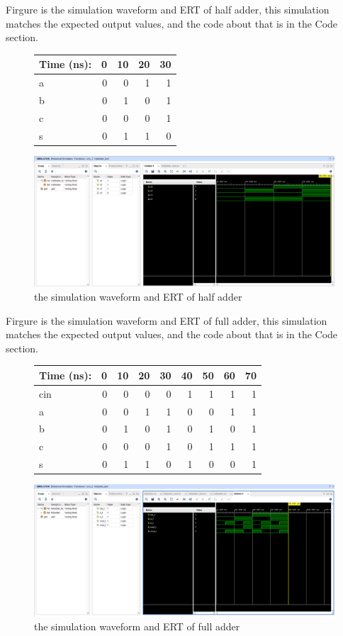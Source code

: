 \documentclass[11pt]{article}
\begin{document}
Firgure is the simulation waveform and ERT of half adder, this simulation matches the expected output values, and the code about that is in the Code section. \\
\begin{figure}[ht]\centering
	\begin{tabular}{l|rrrr}
		Time (ns): & 0 & 10 & 20 & 30 \\
		\midrule
		a & 0 & 0 & 1 & 1 \\
		b & 0 & 1 & 0 & 1 \\
		\midrule
		c & 0 & 0 & 0 & 1 \\
		s & 0 & 1 & 1 & 0 \\
		\bottomrule
	\end{tabular}\medskip
		
	\includegraphics{HalfAdderSimulation}
	\caption{the simulation waveform and ERT of half adder}
	\label{fig:HalfAdderSimulation}
\end{figure}

Firgure is the simulation waveform and ERT of full adder, this simulation matches the expected output values, and the code about that is in the Code section. \\
\begin{figure}[ht]\centering
	\begin{tabular}{l|rrrr|rrrr}
		Time (ns): & 0 & 10 & 20 & 30 & 40 & 50 & 60 & 70\\
		\midrule
		cin & 0 & 0 & 0 & 0 & 1 & 1 & 1 & 1 \\
		a & 0 & 0 & 1 & 1 & 0 & 0 & 1 & 1 \\
		b & 0 & 1 & 0 & 1 & 0 & 1 & 0 & 1 \\
		\midrule
		c & 0 & 0 & 0 & 1 & 0 & 1 & 1 & 1 \\
		s & 0 & 1 & 1 & 0 & 1 & 0 & 0 & 1\\
		\bottomrule
	\end{tabular}\medskip
		
	\includegraphics{FullAdderSimulation}
	\caption{the simulation waveform and ERT of full adder}
	\label{fig:FullAdderSimulation}
\end{figure}
\end{document}
